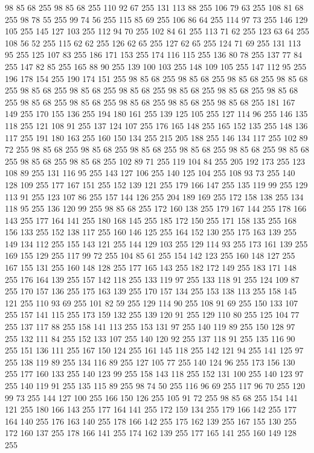 98 85 68 255 98 85 68 255 110 92 67 255 131 113 88 255 106 79 63 255 108 81 68 255 98 78 55 255 99 74 56 255 115 85 69 255 106 86 64 255 114 97 73 255 146 129 105 255 145 127 103 255 112 94 70 255 102 84 61 255 113 71 62 255 123 63 64 255 108 56 52 255 115 62 62 255 126 62 65 255 127 62 65 255 124 71 69 255 131 113 95 255 125 107 83 255 186 171 153 255 174 116 115 255 136 80 78 255 137 77 84 255 147 82 85 255 165 88 90 255 139 100 103 255 148 109 105 255 147 112 95 255 196 178 154 255 190 174 151 255 98 85 68 255 98 85 68 255 98 85 68 255 98 85 68 255 98 85 68 255 98 85 68 255 98 85 68 255 98 85 68 255 98 85 68 255 98 85 68 255 98 85 68 255 98 85 68 255 98 85 68 255 98 85 68 255 98 85 68 255 181 167 149 255 170 155 136 255 194 180 161 255 139 125 105 255 127 114 96 255 146 135 118 255 121 108 91 255 137 124 107 255 176 165 148 255 165 152 135 255 148 136 117 255 191 180 163 255 160 150 134 255 215 205 188 255
146 134 117 255 102 89 72 255 98 85 68 255 98 85 68 255 98 85 68 255 98 85 68 255 98 85 68 255 98 85 68 255 98 85 68 255 98 85 68 255 102 89 71 255 119 104 84 255 205 192 173 255 123 108 89 255 131 116 95 255 143 127 106 255 140 125 104 255 108 93 73 255 140 128 109 255 177 167 151 255 152 139 121 255 179 166 147 255 135 119 99 255 129 113 91 255 123 107 86 255 157 144 126 255 204 189 169 255 172 158 138 255 134 118 95 255 136 120 99 255 98 85 68 255 172 160 138 255 179 167 144 255 178 166 143 255 177 164 141 255 180 168 145 255 185 172 150 255 171 158 135 255 168 156 133 255 152 138 117 255 160 146 125 255 164 152 130 255 175 163 139 255 149 134 112 255 155 143 121 255 144 129 103 255 129 114 93 255 173 161 139 255 169 155 129 255 117 99 72 255 104 85 61 255 154 142 123 255 160 148 127 255 167 155 131 255 160 148 128 255 177 165 143 255 182 172 149 255 183 171 148 255 176 164 139 255 157 142 118 255 133 119 97 255 133 118 91 255 124 109 87 255 170 157 136 255
175 163 139 255 170 157 134 255 153 138 113 255 158 145 121 255 110 93 69 255 101 82 59 255 129 114 90 255 108 91 69 255 150 133 107 255 157 141 115 255 173 159 132 255 139 120 91 255 129 110 80 255 125 104 77 255 137 117 88 255 158 141 113 255 153 131 97 255 140 119 89 255 150 128 97 255 132 111 84 255 152 133 107 255 140 120 92 255 137 118 91 255 135 116 90 255 151 136 111 255 167 150 124 255 161 145 118 255 142 121 94 255 141 125 97 255 138 119 89 255 134 116 89 255 127 105 77 255 140 124 96 255 173 156 130 255 177 160 133 255 140 123 99 255 158 143 118 255 152 131 100 255 140 123 97 255 140 119 91 255 135 115 89 255 98 74 50 255 116 96 69 255 117 96 70 255 120 99 73 255 144 127 100 255 166 150 126 255 105 91 72 255 98 85 68 255 154 141 121 255 180 166 143 255 177 164 141 255 172 159 134 255 179 166 142 255 177 164 140 255 176 163 140 255 178 166 142 255 175 162 139 255 167 155 130 255 172 160 137 255 178 166 141 255 174 162 139 255 177 165 141 255 160 149 128 255
